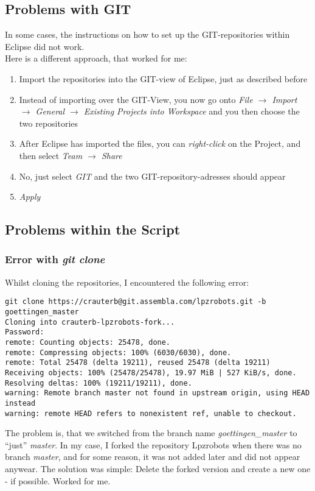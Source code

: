 \subsection{Problems with GIT}
\label{EclipseGIT}
In some cases, the instructions on how to set up the GIT-repositories within Eclipse did not work. \\
Here is a different approach, that worked for me: \\
\begin{enumerate}
 \item Import the repositories into the GIT-view of Eclipse, just as described before
 \item Instead of importing over the GIT-View, you now go onto \emph{File $\rightarrow$ Import $\rightarrow$ General $\rightarrow$ Existing Projects into Workspace} and you then choose the two repositories
 \item After Eclipse has imported the files, you can \emph{right-click} on the Project, and then select \emph{Team $\rightarrow$ Share}
 \item No, just select \emph{GIT} and the two GIT-repository-adresses should appear
 \item \emph{Apply}
\end{enumerate}


\subsection{Problems within the Script}

\subsubsection{Error with \emph{git clone}}

Whilst cloning the repositories, I encountered the following error:
\begin{lstlisting}
git clone https://crauterb@git.assembla.com/lpzrobots.git -b goettingen_master
Cloning into crauterb-lpzrobots-fork...
Password: 
remote: Counting objects: 25478, done.
remote: Compressing objects: 100% (6030/6030), done.
remote: Total 25478 (delta 19211), reused 25478 (delta 19211)
Receiving objects: 100% (25478/25478), 19.97 MiB | 527 KiB/s, done.
Resolving deltas: 100% (19211/19211), done.
warning: Remote branch master not found in upstream origin, using HEAD instead
warning: remote HEAD refers to nonexistent ref, unable to checkout.
\end{lstlisting}

The problem is, that we switched from the branch name \emph{goettingen\_master} to ``just'' \emph{master}. In my case, I forked
the repository Lpzrobots when there was no branch \emph{master}, and for some reason, it was not added later and did not appear anywear.
The solution was simple: Delete the forked version and create a new one - if possible. Worked for me.

 


